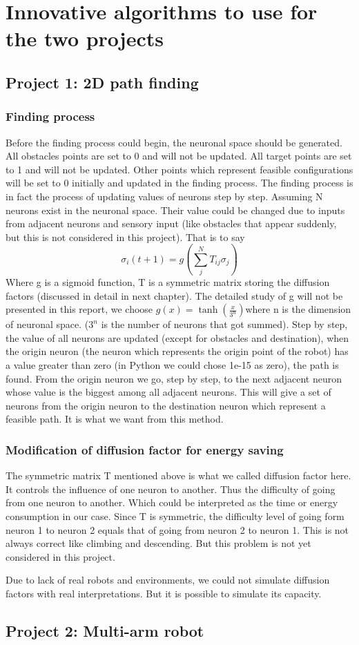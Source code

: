 \chapter{Innovative algorithms to use for the two projects}
\label{cha:algorithm}

\section{Project 1: 2D path finding}
\label{sec:algorithm_project1}

\subsection{Finding process}
Before the finding process could begin, the neuronal space should be generated. 
All obstacles points are set to 0 and will not be updated. 
All target points are set to 1 and will not be updated. 
Other points which represent feasible configurations will be set to 0 initially and updated in the finding process. 
The finding process is in fact the process of updating values of neurons step by step. 
Assuming N neurons exist in the neuronal space. 
Their value could be changed due to inputs from adjacent neurons and sensory input (like obstacles that appear suddenly, but this is not considered in this project). 
That is to say
\[ \sigma_i(t+1)=g(\sum_{j}^{N}{T_{ij}\sigma_j}) \]
Where g is a sigmoid function, T is a symmetric matrix storing the diffusion factors (discussed in detail in next chapter). 
The detailed study of g will not be presented in this report, we choose \(g(x)=\tanh(\frac{x}{3^n}) \)where n is the dimension of neuronal space. 
(\(3^n\) is the number of neurons that got summed).
Step by step, the value of all neurons are updated (except for obstacles and destination), when the origin neuron (the neuron which represents the origin point of the robot) has a value greater than zero (in Python we could chose 1e-15 as zero), the path is found. From the origin neuron we go, step by step, to the next adjacent neuron whose value is the biggest among all adjacent neurons. This will give a set of neurons from the origin neuron to the destination neuron which represent a feasible path. It is what we want from this method. 

\subsection{Modification of diffusion factor for energy saving}
The symmetric matrix T mentioned above is what we called diffusion factor here. 
It controls the influence of one neuron to another. 
Thus the difficulty of going from one neuron to another. 
Which could be interpreted as the time or energy consumption in our case. 
Since T is symmetric, the difficulty level of going form neuron 1 to neuron 2 equals that of going from neuron 2 to neuron 1. 
This is not always correct like climbing and descending. 
But this problem is not yet considered in this project. 

Due to lack of real robots and environments, we could not simulate diffusion factors with real interpretations. 
But it is possible to simulate its capacity. 


\section{Project 2: Multi-arm robot}
\label{sec:algorithm_project2}